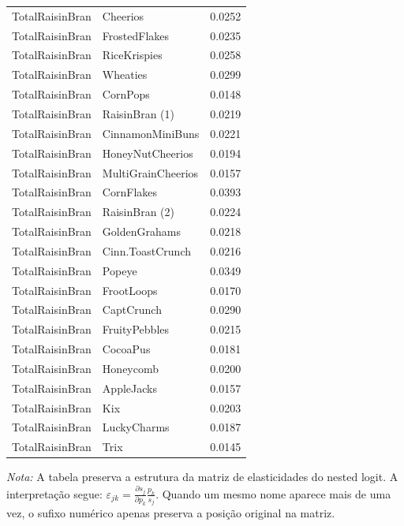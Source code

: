 \begin{table}[H]
\begin{tabular}{llr}
TotalRaisinBran & Cheerios & 0.0252 \\
TotalRaisinBran & FrostedFlakes & 0.0235 \\
TotalRaisinBran & RiceKrispies & 0.0258 \\
TotalRaisinBran & Wheaties & 0.0299 \\
TotalRaisinBran & CornPops & 0.0148 \\
TotalRaisinBran & RaisinBran (1) & 0.0219 \\
TotalRaisinBran & CinnamonMiniBuns & 0.0221 \\
TotalRaisinBran & HoneyNutCheerios & 0.0194 \\
TotalRaisinBran & MultiGrainCheerios & 0.0157 \\
TotalRaisinBran & CornFlakes & 0.0393 \\
TotalRaisinBran & RaisinBran (2) & 0.0224 \\
TotalRaisinBran & GoldenGrahams & 0.0218 \\
TotalRaisinBran & Cinn.ToastCrunch & 0.0216 \\
TotalRaisinBran & Popeye & 0.0349 \\
TotalRaisinBran & FrootLoops & 0.0170 \\
TotalRaisinBran & CaptCrunch & 0.0290 \\
TotalRaisinBran & FruityPebbles & 0.0215 \\
TotalRaisinBran & CocoaPus & 0.0181 \\
TotalRaisinBran & Honeycomb & 0.0200 \\
TotalRaisinBran & AppleJacks & 0.0157 \\
TotalRaisinBran & Kix & 0.0203 \\
TotalRaisinBran & LuckyCharms & 0.0187 \\
TotalRaisinBran & Trix & 0.0145 \\
\bottomrule
\end{tabular}

\vspace{0.3em}
\footnotesize
\textit{Nota:} A tabela preserva a estrutura da matriz de elasticidades do nested logit. A interpretação segue: $\varepsilon_{jk}=\frac{\partial s_j}{\partial p_k}\frac{p_k}{s_j}$. Quando um mesmo nome aparece mais de uma vez, o sufixo numérico apenas preserva a posição original na matriz.
\end{table}
\endgroup


